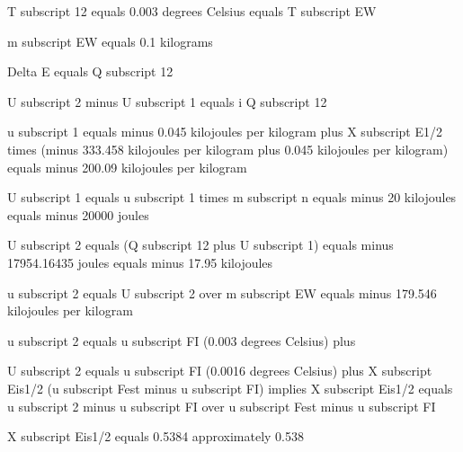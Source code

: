 T subscript 12 equals 0.003 degrees Celsius equals T subscript EW

m subscript EW equals 0.1 kilograms

Delta E equals Q subscript 12

U subscript 2 minus U subscript 1 equals i Q subscript 12

u subscript 1 equals minus 0.045 kilojoules per kilogram plus X subscript E1/2 times (minus 333.458 kilojoules per kilogram plus 0.045 kilojoules per kilogram) equals minus 200.09 kilojoules per kilogram

U subscript 1 equals u subscript 1 times m subscript n equals minus 20 kilojoules equals minus 20000 joules

U subscript 2 equals (Q subscript 12 plus U subscript 1) equals minus 17954.16435 joules equals minus 17.95 kilojoules

u subscript 2 equals U subscript 2 over m subscript EW equals minus 179.546 kilojoules per kilogram

u subscript 2 equals u subscript FI (0.003 degrees Celsius) plus

U subscript 2 equals u subscript FI (0.0016 degrees Celsius) plus X subscript Eis1/2 (u subscript Fest minus u subscript FI) implies X subscript Eis1/2 equals u subscript 2 minus u subscript FI over u subscript Fest minus u subscript FI

X subscript Eis1/2 equals 0.5384 approximately 0.538